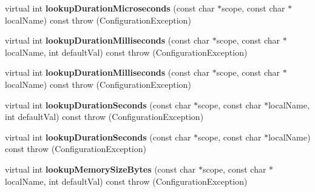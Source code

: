 \begin{DoxyCompactItemize}
\item 
\hypertarget{classCONFIG4CPP__NAMESPACE_1_1ConfigurationImpl_a8d306163be56be07d4517cf9a6076bb9}{virtual int {\bfseries lookup\-Duration\-Microseconds} (const char $\ast$scope, const char $\ast$local\-Name) const   throw (\-Configuration\-Exception)}\label{classCONFIG4CPP__NAMESPACE_1_1ConfigurationImpl_a8d306163be56be07d4517cf9a6076bb9}

\item 
\hypertarget{classCONFIG4CPP__NAMESPACE_1_1ConfigurationImpl_ae024f6bdd790a52f6d464f9935ae2ab3}{virtual int {\bfseries lookup\-Duration\-Milliseconds} (const char $\ast$scope, const char $\ast$local\-Name, int default\-Val) const   throw (\-Configuration\-Exception)}\label{classCONFIG4CPP__NAMESPACE_1_1ConfigurationImpl_ae024f6bdd790a52f6d464f9935ae2ab3}

\item 
\hypertarget{classCONFIG4CPP__NAMESPACE_1_1ConfigurationImpl_a8ea88e907f0fc6b93a2fea6280980f35}{virtual int {\bfseries lookup\-Duration\-Milliseconds} (const char $\ast$scope, const char $\ast$local\-Name) const   throw (\-Configuration\-Exception)}\label{classCONFIG4CPP__NAMESPACE_1_1ConfigurationImpl_a8ea88e907f0fc6b93a2fea6280980f35}

\item 
\hypertarget{classCONFIG4CPP__NAMESPACE_1_1ConfigurationImpl_aad2b9ee577ba777525ca14b8a5571490}{virtual int {\bfseries lookup\-Duration\-Seconds} (const char $\ast$scope, const char $\ast$local\-Name, int default\-Val) const   throw (\-Configuration\-Exception)}\label{classCONFIG4CPP__NAMESPACE_1_1ConfigurationImpl_aad2b9ee577ba777525ca14b8a5571490}

\item 
\hypertarget{classCONFIG4CPP__NAMESPACE_1_1ConfigurationImpl_a15fb244411d1171e1538ed210627acb6}{virtual int {\bfseries lookup\-Duration\-Seconds} (const char $\ast$scope, const char $\ast$local\-Name) const   throw (\-Configuration\-Exception)}\label{classCONFIG4CPP__NAMESPACE_1_1ConfigurationImpl_a15fb244411d1171e1538ed210627acb6}

\item 
\hypertarget{classCONFIG4CPP__NAMESPACE_1_1ConfigurationImpl_a894377f8d18a23c32deddc071828bfc2}{virtual int {\bfseries lookup\-Memory\-Size\-Bytes} (const char $\ast$scope, const char $\ast$local\-Name, int default\-Val) const   throw (\-Configuration\-Exception)}\label{classCONFIG4CPP__NAMESPACE_1_1ConfigurationImpl_a894377f8d18a23c32deddc071828bfc2}


\end{DoxyCompactItemize}
